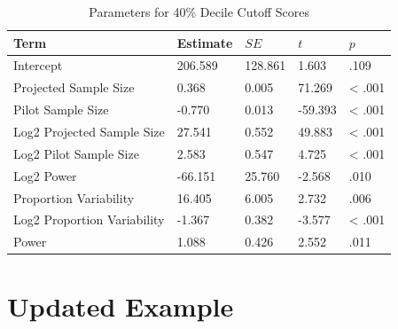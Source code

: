\documentclass[
  man]{apa7}
\begin{document}
\begin{table}[tbp]

\begin{center}
\begin{threeparttable}

\caption{\label{tab:table-decile}Parameters for 40\% Decile Cutoff Scores}

\begin{tabular}{lllll}
\toprule
Term & Estimate & $SE$ & $t$ & $p$\\
\midrule
Intercept & 206.589 & 128.861 & 1.603 & .109\\
Projected Sample Size & 0.368 & 0.005 & 71.269 & < .001\\
Pilot Sample Size & -0.770 & 0.013 & -59.393 & < .001\\
Log2 Projected Sample Size & 27.541 & 0.552 & 49.883 & < .001\\
Log2 Pilot Sample Size & 2.583 & 0.547 & 4.725 & < .001\\
Log2 Power & -66.151 & 25.760 & -2.568 & .010\\
Proportion Variability & 16.405 & 6.005 & 2.732 & .006\\
Log2 Proportion Variability & -1.367 & 0.382 & -3.577 & < .001\\
Power & 1.088 & 0.426 & 2.552 & .011\\
\bottomrule
\end{tabular}

\end{threeparttable}
\end{center}

\end{table}

\hypertarget{updated-example}{%
\section{Updated Example}\label{updated-example}}
\end{document}
